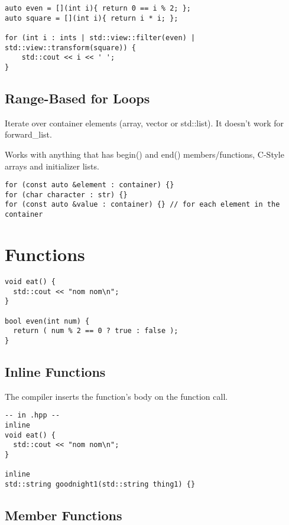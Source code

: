\begin{verbatim}
auto even = [](int i){ return 0 == i % 2; };
auto square = [](int i){ return i * i; };

for (int i : ints | std::view::filter(even) | std::view::transform(square)) {
    std::cout << i << ' ';
}
\end{verbatim}

\subsection{Range-Based for Loops}

Iterate over container elements (array, vector or std::list). It doesn't work for forward\_list.

Works with anything that has begin()
and end() members/functions, C-Style arrays and initializer lists.

\begin{verbatim}
for (const auto &element : container) {}
for (char character : str) {}
for (const auto &value : container) {} // for each element in the container
\end{verbatim}

\section{Functions}

\begin{verbatim}
void eat() {
  std::cout << "nom nom\n";
}

bool even(int num) {
  return ( num % 2 == 0 ? true : false );
}
\end{verbatim}

\subsection{Inline Functions}

The compiler inserts the function’s body on the function call.

\begin{verbatim}
-- in .hpp -- 
inline 
void eat() {
  std::cout << "nom nom\n";
}

inline
std::string goodnight1(std::string thing1) {}
\end{verbatim}

\subsection{Member Functions}

